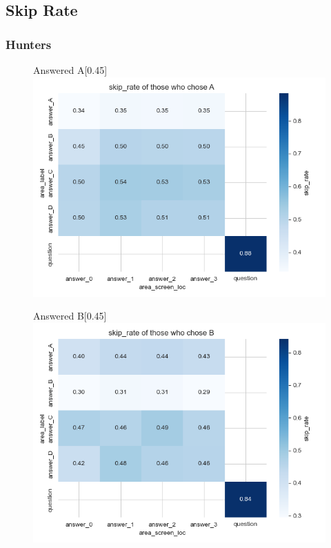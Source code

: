 \documentclass{article}
\begin{document}
\subsection{Skip Rate}
\subsubsection{Hunters}

\begin{figure}[H]
  \centering
  \begin{subcaptionbox}{Answered A\label{fig:A_sr_h}}[0.45\textwidth]
    {\centering\includegraphics[width=\linewidth]{plots/matrix_plots/matrix_skip_rate_A_hunters.png}}
  \end{subcaptionbox}
  \hfill
  \begin{subcaptionbox}{Answered B\label{fig:B_sr_h}}[0.45\textwidth]
    {\centering\includegraphics[width=\linewidth]{plots/matrix_plots/matrix_skip_rate_B_hunters.png}}
  \end{subcaptionbox}
  

\end{figure}
\end{document}
